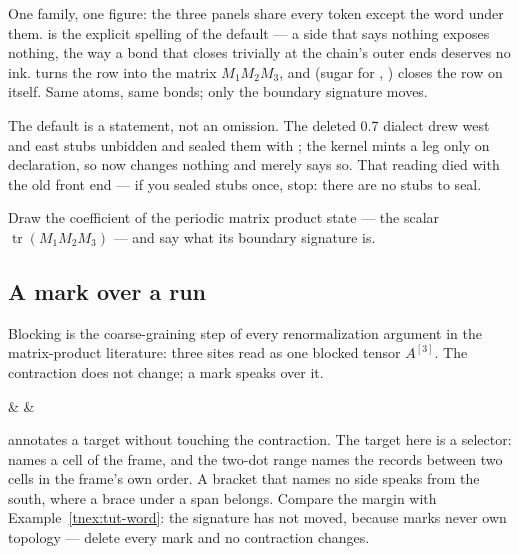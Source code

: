 One family, one figure: the three panels share every token except the
word under them.   is the explicit spelling of the default
--- a side that says nothing exposes nothing, the way a bond that closes
trivially at the chain's outer ends deserves no ink.   turns
the row into the matrix $M_1M_2M_3$, and  (sugar for
, ) closes the row on
itself.  Same atoms, same bonds; only the boundary signature moves.

\dbendpar The default is a statement, not an omission.  The deleted
0.7 dialect drew west and east stubs unbidden and sealed them with
; the kernel mints a leg only on declaration, so
 now changes nothing and merely says so.  That reading died
with the old front end --- if you sealed stubs once, stop: there are no
stubs to seal.

 Draw the coefficient of the periodic matrix
product state --- the scalar $\operatorname{tr}(M_1M_2M_3)$ --- and say
what its boundary signature is.

\subsection{A mark over a run}

Blocking is the coarse-graining step of every renormalization argument
in the matrix-product literature: three sites read as one blocked tensor
$A^{[3]}$.  The contraction does not change; a mark speaks over it.

\begin{tnexample}[
  formula={A^{[3]}=A^{i_1}A^{i_2}A^{i_3}},
  caption={blocking three sites},
  index={The bracket speaks from the south, past the site names and their
    ink.  The signature is Example \ref{tnex:tut-word}'s, unchanged: a
    mark owns no topology.},
  signature={kernel-boundary|signature=open:e, open:w, phys:n, phys:n, phys:n}]
\begin{tenkz}[cols=3]
   &
   &
\end{tenkz}
\end{tnexample}

 annotates a target without touching the contraction.  The
target here is a selector:  names a cell of the frame, and
the two-dot range  names the records between two
cells in the frame's own order.  A bracket that names no side speaks from
the south, where a brace under a span belongs.  Compare the margin with
Example~\ref{tnex:tut-word}: the signature has not moved, because marks
never own topology --- delete every mark and no contraction changes.

